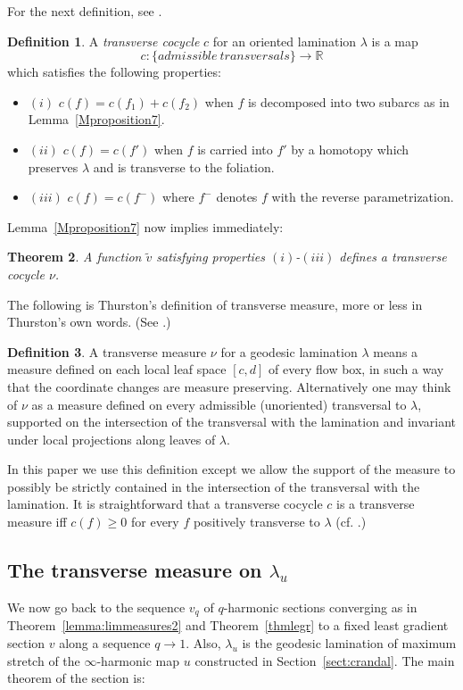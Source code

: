\documentclass{ip-journal}
\newtheorem{theorem}{Theorem}[section]
\theoremstyle{definition}
\newtheorem{definition}[theorem]{Definition}
\numberwithin{equation}{section}
\newcommand{\R}{\mathbb R}
\begin{document}
 For the next definition, see \cite[page 120]{bonahon2}.
 \begin{definition}\label{deftransversecocycle}
 A {\it{transverse cocycle}} $c$ for an oriented lamination $\lambda$ is a map 
 \[
 c: \{ admissible \  transversals \} \rightarrow \R 
 \]
 which satisfies the following properties: 
 \begin{itemize}
\item $(i)$ $c(f) = c(f_1) + c(f_2)$ when $f$ is decomposed into two subarcs as in Lemma~\ref{Mproposition7}.
\item $(ii)$ $c(f) = c (f')$ when $f$ is carried into $f'$ by a homotopy which preserves $ \lambda$ and is transverse to the foliation.
\item $(iii)$ $c(f) = c(f^-)$ where $f^-$ denotes $f$ with the reverse parametrization.
\end{itemize}
\end{definition}

Lemma~\ref{Mproposition7} now implies immediately:

\begin{theorem}\label{thm:tranco}A function $\tilde v$ satisfying properties $(i)$-$(iii)$ defines a transverse cocycle $\nu$. 
\end{theorem}

The following is Thurston's definition of transverse measure, more or less in Thurston's own words. (See \cite[Section 8.6]{thurston2}.)
\begin{definition}A transverse measure $\nu$ for a geodesic lamination $\lambda$ means a measure  defined on each local leaf space $[c,d]$ of every flow box,
in such a way that the coordinate changes are measure preserving. Alternatively one
may think of $\nu$ as a measure defined on every admissible (unoriented) transversal 
to $\lambda$, supported on the intersection of the transversal with the lamination and invariant under local projections along leaves of $\lambda$. 

In this paper we use this definition except we allow the support of the measure to possibly be strictly contained in the intersection of the transversal with the lamination. It is straightforward that a transverse cocycle $c$ is  a transverse measure iff $c(f) \geq 0$ for every $f$ positively transverse to $\lambda$ (cf. \cite[Proposition 18]{bonahon2}.)
\end{definition}

 
 \subsection{The transverse measure on $\lambda_u$} We now go back to the sequence
$v_q $ of $q$-harmonic sections  converging  as in Theorem~\ref{lemma:limmeasures2} and Theorem~\ref{thmlegr} to a fixed least gradient section $v$ along a sequence $q \rightarrow 1$. Also,   
$\lambda_u$  is the geodesic lamination of maximum stretch of the $\infty$-harmonic map $u$ constructed in Section~\ref{sect:crandal}. 
The main theorem of the section is:
\end{document}
